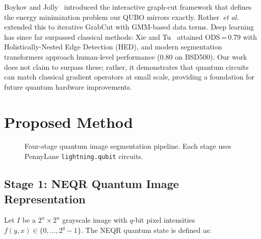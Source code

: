\documentclass[journal]{IEEEtran}
\begin{document}
Boykov and Jolly~\cite{boykov2001graphcuts} introduced the interactive
graph-cut framework that defines the energy minimization problem our QUBO
mirrors exactly.  Rother~\textit{et al.}~\cite{rother2004grabcut} extended
this to iterative GrabCut with GMM-based data terms.  Deep learning has
since far surpassed classical methods: Xie and Tu~\cite{xie2015hed} attained
ODS\,=\,0.79 with Holistically-Nested Edge Detection (HED), and modern
segmentation transformers approach human-level performance (0.80 on BSD500).
Our work does not claim to surpass these; rather, it demonstrates that quantum
circuits can match classical gradient operators at small scale, providing
a foundation for future quantum hardware improvements.

\section{Proposed Method}
\label{sec:method}

\begin{figure}[!t]
\centering
\caption{Four-stage quantum image segmentation pipeline.  Each stage uses
         PennyLane \texttt{lightning.qubit} circuits.}
\label{fig:pipeline}
\end{figure}

\subsection{Stage 1: NEQR Quantum Image Representation}

Let $I$ be a $2^n \times 2^n$ grayscale image with $q$-bit pixel intensities
$f(y,x) \in \{0,\ldots,2^q-1\}$.  The NEQR quantum state is defined as:
\end{document}
